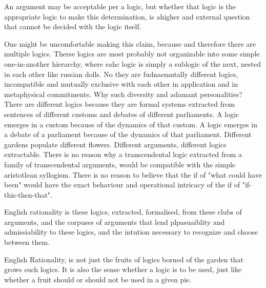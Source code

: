 An argument may be acceptable per a logic, but whether that logic is the appropriate logic to make this determination, is ahigher and external question that cannot be decided with the logic itself. 

One might be uncomfortable making this claim, because and therefore there are multiple logics. Therse logics are most probably not organizable into some simple one-in-another hierarchy, where eahc logic is simply a sublogic of the next, nested in each other like russian dolls. No they are fudnaemntally different logics, incompatible and mutually exclusive with each other in application and in metaphysical commitments. Why such diversity and adamant personalities? There are different logics because they are formal systems extracted from sentences of different customs and debates of different parliaments. A logic emerges in a custom because of the dynamics of that custom. A logic emerges in a debate of a parliament because of the dynamics of that parliament. Different gardens populate different flowers. Different arguments, different logics extractable. There is no reason why a transcendental logic extracted from a family of transcendental arguments, would be compatible with the simple aristotlean syllogism. There is no reason to believe that the if of "what could have been" would have the exact behaviour and operational intricacy of the if of "if-this-then-that".

English rationality is these logics, extracted, formalised, from these clubs of arguments, and the corpuses of arguments that lend plpasuaiblity and admissiability to these logics, and the intution necessary to recognize and choose between them. 

English Rationality, is not just the fruits of logics borned of the garden that grows such logics. It is also the sense whether a logic is to be used, just like whether a fruit should or should not be used in a given pie. 

